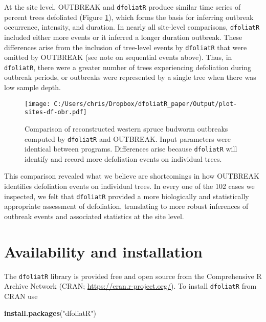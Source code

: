 \documentclass[review]{elsarticle} %
\newenvironment{Shaded}{\begin{snugshade}}{\end{snugshade}}
\newcommand{\KeywordTok}[1]{\textcolor[rgb]{0.13,0.29,0.53}{\textbf{#1}}}
\newcommand{\NormalTok}[1]{#1}
\newcommand{\StringTok}[1]{\textcolor[rgb]{0.31,0.60,0.02}{#1}}
\begin{document}
At the site level, OUTBREAK and \texttt{dfoliatR} produce similar time series of percent trees defoliated (Figure \ref{fig:fig-df-obr}), which forms the basis for inferring outbreak occurrence, intensity, and duration. In nearly all site-level comparisons, \texttt{dfoliatR} included either more events or it inferred a longer duration outbreak. These differences arise from the inclusion of tree-level events by \texttt{dfoliatR} that were omitted by OUTBREAK (see note on sequential events above). Thus, in \texttt{dfoliatR}, there were a greater number of trees experiencing defoliation during outbreak periods, or outbreaks were represented by a single tree when
there was low sample depth.



\begin{figure}
\centering
\texttt{[image: C:/Users/chris/Dropbox/dfoliatR\_paper/Output/plot-sites-df-obr.pdf]}
\caption{\label{fig:fig-df-obr}Comparison of reconstructed western spruce budworm outbreaks computed by \texttt{dfoliatR} and OUTBREAK. Input parameters were identical between programs. Differences arise because \texttt{dfoliatR} will identify and record more defoliation events on individual trees.}
\end{figure}

This comparison revealed what we believe are shortcomings in how OUTBREAK identifies defoliation events on individual trees. In every one of the 102 cases we inspected, we felt that \texttt{dfoliatR} provided a more biologically and statistically appropriate assessment of defoliation, translating to more robust inferences of outbreak events and associated statistics at the site level.

\hypertarget{availability-and-installation}{%
\section{Availability and installation}\label{availability-and-installation}}

The \texttt{dfoliatR} library is provided free and open source from the Comprehensive R Archive Network (CRAN; \url{https://cran.r-project.org/}). To install \texttt{dfoliatR} from CRAN use

\begin{Shaded}
\begin{Highlighting}[]
\KeywordTok{install.packages}\NormalTok{(}\StringTok{"dfoliatR"}\NormalTok{)}
\end{Highlighting}
\end{Shaded}
\end{document}

